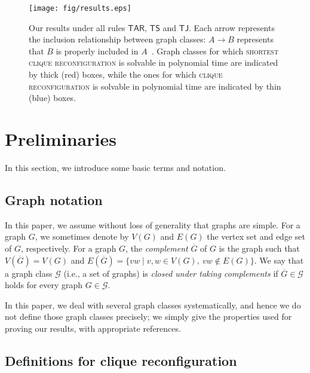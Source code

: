 \documentclass{llncs}
\newcommand{\TS}{\mathsf{TS}}
\newcommand{\TJ}{\mathsf{TJ}}
\newcommand{\TARrule}{\mathsf{TAR}}
\newcounter{one}
\begin{document}
	\begin{figure}[t]
		\centering
		\texttt{[image: fig/results.eps]}
	\vspace{-1em}
	\caption{Our results under all rules $\TARrule$, $\TS$ and $\TJ$. 
Each arrow represents the inclusion relationship between graph classes: 
$A \to B$ represents that $B$ is properly included in $A$~\cite{BLS99}.
Graph classes for which \textsc{shortest clique reconfiguration} is solvable in polynomial time are indicated by thick (red) boxes, 
while the ones for which \textsc{clique reconfiguration} is solvable in polynomial time are indicated by thin (blue) boxes.}
	\vspace{-1em}
	\label{fig:results}
	\end{figure}




	\section{Preliminaries}
	In this section, we introduce some basic terms and notation. 

\subsection{Graph notation}

	In this paper, we assume without loss of generality that graphs are simple.
	For a graph $G$, we sometimes denote by $V(G)$ and $E(G)$ the vertex set and edge set of $G$, respectively. 
For a graph $G$, the \emph{complement} $\overline{G}$ of $G$ is the graph such that $V(\overline{G}) = V(G)$ and $E(\overline{G}) = \{ vw \mid v,w \in V(G),\ vw \not\in E(G) \}$.
	We say that a graph class $\mathcal{G}$ (i.e., a set of graphs) is \emph{closed under taking complements} if $\overline{G} \in \mathcal{G}$ holds for every graph $G \in \mathcal{G}$. 


	In this paper, we deal with several graph classes systematically, and hence we do not define those graph classes precisely;
we simply give the properties used for proving  our results, with appropriate references. 

\subsection{Definitions for {\sc clique reconfiguration}}
\end{document}
